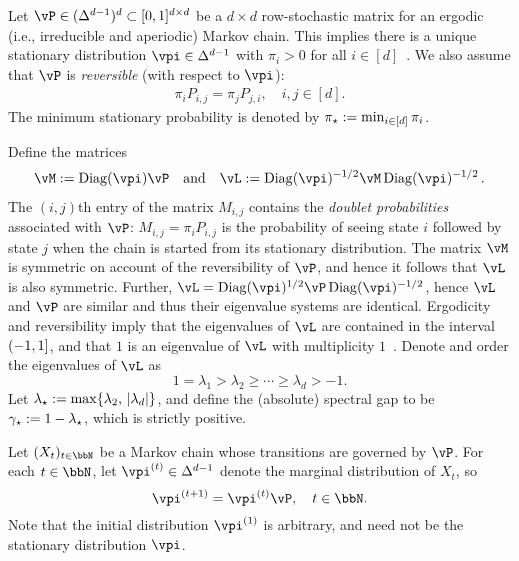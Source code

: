 \label{sec:setting}
Let $\vP \in (\Delta^{d-1})^d \subset [0,1]^{d \times d}$ be a $d
\times d$ row-stochastic matrix for an ergodic (i.e., irreducible and
aperiodic) Markov chain.
This implies there is a unique stationary distribution $\vpi \in
\Delta^{d-1}$ with $\pi_i > 0$ for all $i \in [d]$~\citep[Corollary
1.17]{LePeWi08}.
We also assume that $\vP$ is \emph{reversible} (with respect to
$\vpi$):
\begin{align}
\label{eq:reversibility}
  \pi_i P_{i,j} = \pi_j P_{j,i} ,
  \quad i,j \in [d] .
\end{align}
The minimum stationary probability is denoted by $\pi_{\star} := \min_{i
\in [d]} \pi_i$.

Define the matrices
\begin{align*}
\vM := \Diag(\vpi) \vP \quad \text{and} \quad
\vL := \Diag(\vpi)^{-1/2} \vM \Diag(\vpi)^{-1/2}\,.
\end{align*}
The $(i,j)$th entry of the matrix $M_{i,j}$ contains the \emph{doublet
probabilities} associated with $\vP$: $M_{i,j} = \pi_i P_{i,j}$ is the
probability of seeing state $i$ followed by state $j$ when the chain
is started from its stationary distribution.
The matrix $\vM$ is symmetric on account of the reversibility of
$\vP$, and hence it follows that $\vL$ is also symmetric.
Further, $\vL = \Diag(\vpi)^{1/2} \vP \Diag(\vpi)^{-1/2}$, hence $\vL$
and $\vP$ are similar and thus their eigenvalue systems are identical.
Ergodicity and reversibility imply that the eigenvalues of $\vL$ are
contained in the interval $(-1,1]$, and that $1$ is an
eigenvalue of $\vL$ with multiplicity $1$~\citep[Lemmas 12.1 and
12.2]{LePeWi08}.
Denote and order the eigenvalues of $\vL$ as
\[
  1 = \lambda_1 > \lambda_2 \geq \dotsb \geq \lambda_d > -1 .
\]
Let $\lambda_{\star} := \max\{ \lambda_2,\, |\lambda_d| \}$, and define the
(absolute) spectral gap to be $\gamma_{\star} := 1-\lambda_{\star}$, which is strictly positive.

Let $(X_t)_{t\in\bbN}$ be a Markov chain whose transitions are governed by
$\vP$.
For each $t \in \bbN$, let $\vpi^{(t)} \in \Delta^{d-1}$ denote the
marginal distribution of $X_t$, so
\[
  \vpi^{(t+1)} = \vpi^{(t)} \vP ,
  \quad t \in \bbN .
\]
Note that the initial distribution $\vpi^{(1)}$ is arbitrary,
and need not be the stationary distribution $\vpi$.


